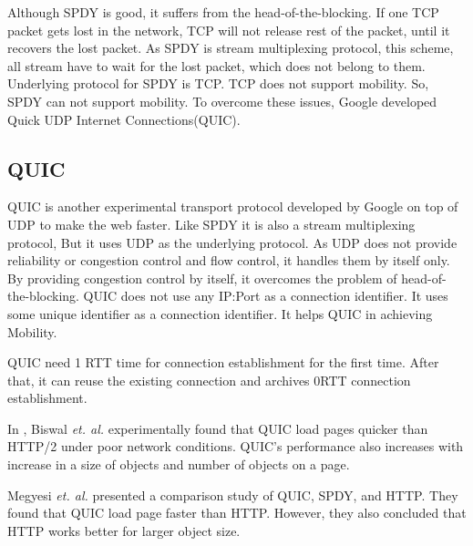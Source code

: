 Although SPDY is good, it suffers from the head-of-the-blocking. If one TCP packet gets lost in the network, TCP will not release rest of the packet, until it recovers the lost packet. As SPDY is stream multiplexing protocol, this scheme, all stream have to wait for the lost packet, which does not belong to them. Underlying protocol for SPDY is TCP. TCP does not support mobility. So, SPDY can not support mobility. To overcome these issues, Google developed Quick UDP Internet Connections(QUIC).

\subsection{QUIC}
QUIC\cite{quic} is another experimental transport protocol developed by Google on top of UDP to make the web faster. Like SPDY it is also a stream multiplexing protocol, But it uses UDP as the underlying protocol. As UDP does not provide reliability or congestion control and flow control, it handles them by itself only. By providing congestion control by itself, it overcomes the problem of head-of-the-blocking. QUIC does not use any IP:Port as a connection identifier. It uses some unique identifier as a connection identifier. It helps QUIC in achieving Mobility.

QUIC need 1 RTT time for connection establishment for the first time. After that, it can reuse the existing connection and archives 0RTT connection establishment. 

In \cite{quicmakewebfast}, Biswal \textit{et. al.} experimentally found that QUIC load pages quicker than HTTP/2 under poor network conditions. QUIC's performance also increases with increase in a size of objects and number of objects on a page.

Megyesi \textit{et. al.} presented a comparison study of QUIC, SPDY, and HTTP\cite{quicisquic}. They found that QUIC load page faster than HTTP. However, they also concluded that HTTP works better for larger object size.